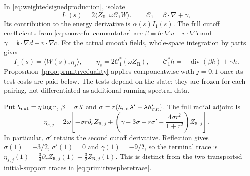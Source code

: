 \documentclass[11pt]{article}
\numberwithin{equation}{section}
\begin{document}
In \eqref{eq:weightedsignedproduction}, isolate
\[
 I_1(s)=2\langle Z_{\mathrm R},\omega\mathscr C_1W\rangle,
 \qquad
 \mathscr C_1=\beta\cdot\nabla+\gamma,
\]
Its contribution to the energy derivative is $\alpha(s)I_1(s)$.
The full cutoff coefficients from
\eqref{eq:sourcefullcommutator} are
$\beta=b\cdot\nabla v-v\cdot\nabla b$ and
$\gamma=b\cdot\nabla d-v\cdot\nabla c$.
For the actual smooth fields, whole-space integration by parts gives
\begin{equation}\label{eq:primitiveproductiontest}
 I_1(s)=\langle W(s),\eta_s\rangle,\qquad
 \eta_s=2\mathscr C_1^*(\omega Z_{\mathrm R}),\qquad
 \mathscr C_1^*h=-\operatorname{div}(\beta h)+\gamma h.
\end{equation}
Proposition~\ref{prop:primitiveduality} applies componentwise with
$j=0,1$ once its test costs are paid below. The tests depend on the
state; they are frozen for each pairing, not differentiated as
additional running spectral data.

Put $h_{\rm cut}=\eta\log r$, $\beta=\sigma X$ and
$\sigma=r(h_{\rm cut}\lambda'-\lambda h_{\rm cut}')$. The full radial adjoint is
\begin{equation}\label{eq:primitivefulladjoint}
 \eta_{s,j}=2\omega\left[-\sigma r\partial_rZ_{\mathrm R,j}
 +\left(\gamma-3\sigma-r\sigma'
       +\frac{4\sigma r^2}{1+r^2}\right)Z_{\mathrm R,j}\right].
\end{equation}
In particular, $\sigma'$ retains the second cutoff derivative.
Reflection gives $\sigma(1)=-3/2$, $\sigma'(1)=0$ and
$\gamma(1)=-9/2$, so the terminal trace is
$\eta_{s,j}(1)=\tfrac34\partial_rZ_{\mathrm R,j}(1)
-\tfrac32Z_{\mathrm R,j}(1)$. This is distinct from the two transported
initial-support traces in \eqref{eq:primitivespheretrace}.
\end{document}
